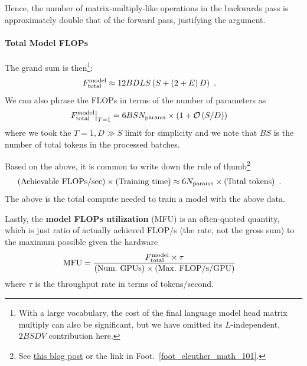 \documentclass[11pt]{article}
\begin{document}
Hence, the number of matrix-multiply-like operations in the backwards pass is approximately double that
of the forward pass, justifying the argument.


\paragraph{Total Model FLOPs}


The grand sum is then\footnote{With a large vocabulary, the cost of the final language model head
matrix multiply can also be significant, but we have omitted its $ L $-independent,  $ 2BSDV $
contribution here. }:
\begin{align}
F _{ {\rm total}  } ^{ {\rm  model}  } &\approx 12 BDLS \left ( S + \left ( 2+E \right )D \right ) \label{eq_model_flops}\ .
\end{align}
We can also phrase the FLOPs in terms of the number of parameters as
\begin{align}
 F _{ {\rm total}  } ^{ {\rm  model}  } \big| _{ T=1 }  &= 6BS N _{ {\rm  params}  }\times \left ( 1 + \mathcal{O} \left( S/D\right)  \right )
\end{align}
where we took the $ T=1, D \gg S $ limit for simplicity and we note that $ BS $  is the number of
total tokens in the processed batches.

Based on the above, it is common to write down the rule of
thumb\footnote{See
\href{https://medium.com/@dzmitrybahdanau/the-flops-calculus-of-language-model-training-3b19c1f025e4}{this
blog post} or the link in Foot.~\ref{foot_eleuther_math_101}.}
\begin{align}
  \left ( {\rm Achievable \ FLOPs/sec}  \right ) \times \left ( {\rm  Training \ time}  \right )
  &\approx 6 N _{ {\rm params}  } \times \left ( {\rm Total \ tokens} \right ) \ . \label{eq_training_rule_of_thumb}
\end{align}
The above is the total compute needed to train a model with the above data.


Lastly, the \textbf{model FLOPs utilization} (MFU) is an often-quoted quantity, which is just ratio
of actually achieved FLOP/s (the rate, not the gross sum) to the maximum possible given the hardware
\begin{align}
  {\rm MFU}  &= \frac{ F _{ {\rm total}  } ^{ {\rm  model}  } \times \tau }{ \left ( {\rm Num. \ GPUs}  \right ) \times \left ( {\rm Max. \ FLOP/s/GPU}  \right ) }
\end{align}
where $ \tau $ is the throughput rate in terms of tokens/second.
\end{document}
